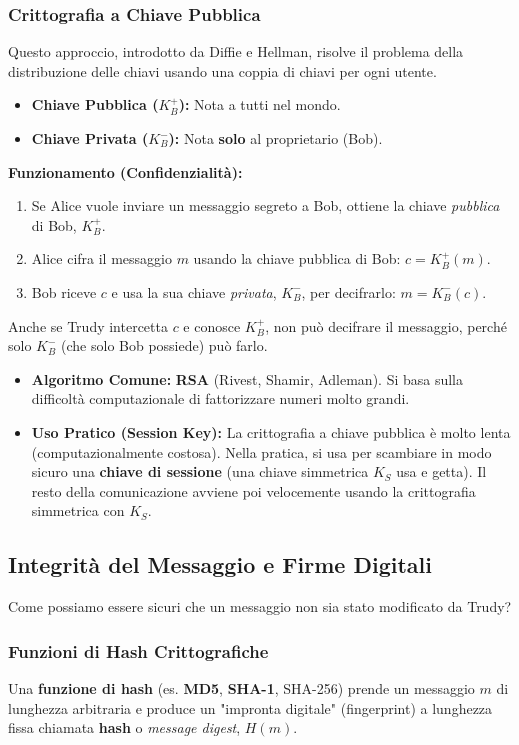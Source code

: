 \subsubsection{Crittografia a Chiave Pubblica}
Questo approccio, introdotto da Diffie e Hellman, risolve il problema della distribuzione delle chiavi usando una coppia di chiavi per ogni utente.
\begin{itemize}
    \item \textbf{Chiave Pubblica ($K_B^+$):} Nota a tutti nel mondo.
    \item \textbf{Chiave Privata ($K_B^-$):} Nota \textbf{solo} al proprietario (Bob).
\end{itemize}

\textbf{Funzionamento (Confidenzialità):}
\begin{enumerate}
    \item Se Alice vuole inviare un messaggio segreto a Bob, ottiene la chiave \textit{pubblica} di Bob, $K_B^+$.
    \item Alice cifra il messaggio $m$ usando la chiave pubblica di Bob: $c = K_B^+(m)$.
    \item Bob riceve $c$ e usa la sua chiave \textit{privata}, $K_B^-$, per decifrarlo: $m = K_B^-(c)$.
\end{enumerate}
Anche se Trudy intercetta $c$ e conosce $K_B^+$, non può decifrare il messaggio, perché solo $K_B^-$ (che solo Bob possiede) può farlo.

\begin{itemize}
    \item \textbf{Algoritmo Comune:} \textbf{RSA} (Rivest, Shamir, Adleman). Si basa sulla difficoltà computazionale di fattorizzare numeri molto grandi.
    \item \textbf{Uso Pratico (Session Key):} La crittografia a chiave pubblica è molto lenta (computazionalmente costosa). Nella pratica, si usa per scambiare in modo sicuro una \textbf{chiave di sessione} (una chiave simmetrica $K_S$ usa e getta). Il resto della comunicazione avviene poi velocemente usando la crittografia simmetrica con $K_S$.
\end{itemize}

\subsection{Integrità del Messaggio e Firme Digitali}
Come possiamo essere sicuri che un messaggio non sia stato modificato da Trudy?

\subsubsection{Funzioni di Hash Crittografiche}
Una \textbf{funzione di hash} (es. \textbf{MD5}, \textbf{SHA-1}, SHA-256) prende un messaggio $m$ di lunghezza arbitraria e produce un "impronta digitale" (fingerprint) a lunghezza fissa chiamata \textbf{hash} o \textit{message digest}, $H(m)$.


